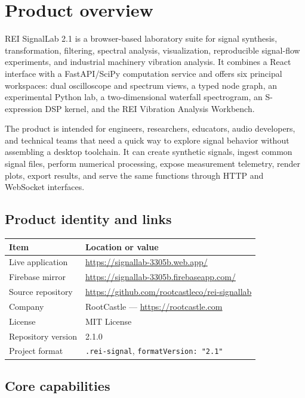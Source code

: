 \documentclass[10pt,a4paper]{article}
\newcommand{\product}{REI SignalLab 2.1}
\newcommand{\code}[1]{\nolinkurl{#1}}
\begin{document}
\tableofcontents
\newpage

\section{Product overview}

\product{} is a browser-based laboratory suite for signal synthesis, transformation, filtering, spectral analysis, visualization, reproducible signal-flow experiments, and industrial machinery vibration analysis. It combines a React interface with a FastAPI/SciPy computation service and offers six principal workspaces: dual oscilloscope and spectrum views, a typed node graph, an experimental Python lab, a two-dimensional waterfall spectrogram, an S-expression DSP kernel, and the REI Vibration Analysis Workbench.

The product is intended for engineers, researchers, educators, audio developers, and technical teams that need a quick way to explore signal behavior without assembling a desktop toolchain. It can create synthetic signals, ingest common signal files, perform numerical processing, expose measurement telemetry, render plots, export results, and serve the same functions through HTTP and WebSocket interfaces.

\subsection{Product identity and links}

\begin{tabularx}{\textwidth}{L{3.4cm}Y}
\toprule
Item & Location or value\\
\midrule
Live application & \url{https://signallab-3305b.web.app/}\\
Firebase mirror & \url{https://signallab-3305b.firebaseapp.com/}\\
Source repository & \url{https://github.com/rootcastleco/rei-signallab}\\
Company & RootCastle --- \url{https://rootcastle.com}\\
License & MIT License\\
Repository version & 2.1.0\\
Project format & \code{.rei-signal}, \code{formatVersion: "2.1"}\\
\bottomrule
\end{tabularx}

\subsection{Core capabilities}
\end{document}
